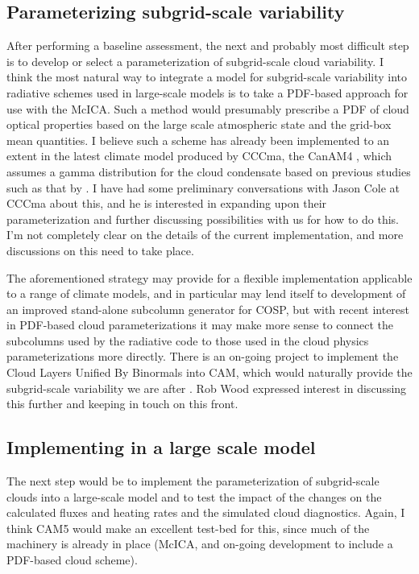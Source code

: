 \documentclass{article}
\begin{document}
\subsection{Parameterizing subgrid-scale variability}
After performing a baseline assessment, the next and probably most difficult step is to develop or select a parameterization of subgrid-scale cloud variability. I think the most natural way to integrate a model for subgrid-scale variability into radiative schemes used in large-scale models is to take a PDF-based approach for use with the McICA. Such a method would presumably prescribe a PDF of cloud optical properties based on the large scale atmospheric state and the grid-box mean quantities. I believe such a scheme has already been implemented to an extent in the latest climate model produced by CCCma, the CanAM4 \citep{von_salzen_et_al_2012}, which assumes a gamma distribution for the cloud condensate based on previous studies such as that by \cite{barker_1996}. I have had some preliminary conversations with Jason Cole at CCCma about this, and he is interested in expanding upon their parameterization and further discussing possibilities with us for how to do this. I'm not completely clear on the details of the current implementation, and more discussions on this need to take place.

The aforementioned strategy may provide for a flexible implementation applicable to a range of climate models, and in particular may lend itself to development of an improved stand-alone subcolumn generator for COSP, but with recent interest in PDF-based cloud parameterizations it may make more sense to connect the subcolumns used by the radiative code to those used in the cloud physics parameterizations more directly. There is an on-going project to implement the Cloud Layers Unified By Binormals \citep[CLUBB][]{golaz_et_al_2002} into CAM, which would naturally provide the subgrid-scale variability we are after \citep{wood_2012}. Rob Wood expressed interest in discussing this further and keeping in touch on this front.

\subsection{Implementing in a large scale model}
The next step would be to implement the parameterization of subgrid-scale clouds into a large-scale model and to test the impact of the changes on the calculated fluxes and heating rates and the simulated cloud diagnostics. Again, I think CAM5 would make an excellent test-bed for this, since much of the machinery is already in place (McICA, and on-going development to include a PDF-based cloud scheme).
\end{document}
